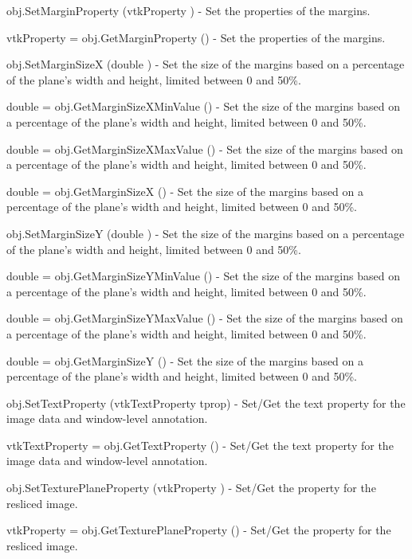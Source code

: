 \begin{DoxyItemize}
\item {\ttfamily obj.\-Set\-Margin\-Property (vtk\-Property )} -\/ Set the properties of the margins.  
\item {\ttfamily vtk\-Property = obj.\-Get\-Margin\-Property ()} -\/ Set the properties of the margins.  
\item {\ttfamily obj.\-Set\-Margin\-Size\-X (double )} -\/ Set the size of the margins based on a percentage of the plane's width and height, limited between 0 and 50\%.  
\item {\ttfamily double = obj.\-Get\-Margin\-Size\-X\-Min\-Value ()} -\/ Set the size of the margins based on a percentage of the plane's width and height, limited between 0 and 50\%.  
\item {\ttfamily double = obj.\-Get\-Margin\-Size\-X\-Max\-Value ()} -\/ Set the size of the margins based on a percentage of the plane's width and height, limited between 0 and 50\%.  
\item {\ttfamily double = obj.\-Get\-Margin\-Size\-X ()} -\/ Set the size of the margins based on a percentage of the plane's width and height, limited between 0 and 50\%.  
\item {\ttfamily obj.\-Set\-Margin\-Size\-Y (double )} -\/ Set the size of the margins based on a percentage of the plane's width and height, limited between 0 and 50\%.  
\item {\ttfamily double = obj.\-Get\-Margin\-Size\-Y\-Min\-Value ()} -\/ Set the size of the margins based on a percentage of the plane's width and height, limited between 0 and 50\%.  
\item {\ttfamily double = obj.\-Get\-Margin\-Size\-Y\-Max\-Value ()} -\/ Set the size of the margins based on a percentage of the plane's width and height, limited between 0 and 50\%.  
\item {\ttfamily double = obj.\-Get\-Margin\-Size\-Y ()} -\/ Set the size of the margins based on a percentage of the plane's width and height, limited between 0 and 50\%.  
\item {\ttfamily obj.\-Set\-Text\-Property (vtk\-Text\-Property tprop)} -\/ Set/\-Get the text property for the image data and window-\/level annotation.  
\item {\ttfamily vtk\-Text\-Property = obj.\-Get\-Text\-Property ()} -\/ Set/\-Get the text property for the image data and window-\/level annotation.  
\item {\ttfamily obj.\-Set\-Texture\-Plane\-Property (vtk\-Property )} -\/ Set/\-Get the property for the resliced image.  
\item {\ttfamily vtk\-Property = obj.\-Get\-Texture\-Plane\-Property ()} -\/ Set/\-Get the property for the resliced image.  

\end{DoxyItemize}
